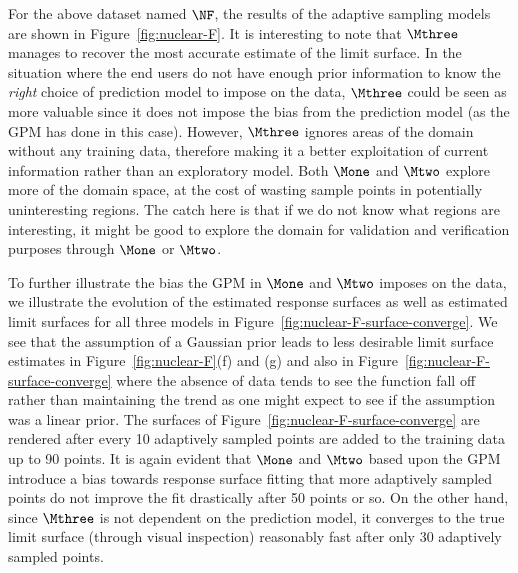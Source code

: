 For the above dataset named $\NF$, the results of the adaptive sampling models are shown in Figure~\ref{fig:nuclear-F}.
%
It is interesting to note that $\Mthree$ manages to recover the most accurate estimate of the limit surface.
%
In the situation where the end users do not have enough prior information to know the \emph{right} choice of prediction model to impose on the data, $\Mthree$ could be seen as more valuable since it does not impose the bias from the prediction model (as the GPM has done in this case).
%
However, $\Mthree$ ignores areas of the domain without any training data, therefore making it a better exploitation of current information rather than an exploratory model.
%
Both $\Mone$ and $\Mtwo$ explore more of the domain space, at the cost of wasting sample points in potentially uninteresting regions.
%
The catch here is that if we do not know what regions are interesting, it might be good to explore the domain for validation and verification purposes through $\Mone$ or $\Mtwo$.

To further illustrate the bias the GPM in $\Mone$ and $\Mtwo$ imposes on the data, we illustrate the evolution of the estimated response surfaces as well as estimated limit surfaces for all three models in Figure~\ref{fig:nuclear-F-surface-converge}.
%
We see that the assumption of a Gaussian prior leads to less desirable limit surface estimates in Figure~\ref{fig:nuclear-F}(f) and (g) and also in Figure~\ref{fig:nuclear-F-surface-converge} where the absence of data tends to see the function fall off rather than maintaining the trend as one might expect to see if the assumption was a linear prior.
%
The surfaces of Figure~\ref{fig:nuclear-F-surface-converge} are rendered after every 10 adaptively sampled points are added to the training data up to 90 points.
%
It is again evident that $\Mone$ and $\Mtwo$ based upon the GPM introduce a bias towards response surface fitting that more adaptively sampled points do not improve the fit drastically after 50 points or so.
%
On the other hand, since $\Mthree$ is not dependent on the prediction model, it converges to the true limit surface (through visual inspection) reasonably fast after only 30 adaptively sampled points.

